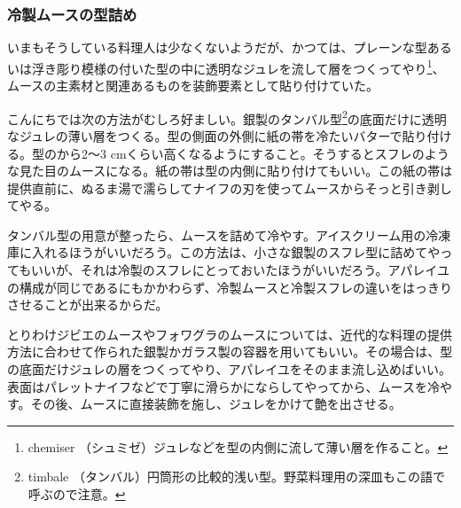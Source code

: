 \begin{recette}
\hypertarget{moulage-des-mousses-froides}{%
\subsubsection{冷製ムースの型詰め}\label{moulage-des-mousses-froides}}



いまもそうしている料理人は少なくないようだが、かつては、プレーンな型あるいは浮き彫り模様の付いた型の中に透明なジュレを流して層をつくってやり\footnote{chemiser
  （シュミゼ）ジュレなどを型の内側に流して薄い層を作ること。}、ムースの主素材と関連あるものを装飾要素として貼り付けていた。

こんにちでは次の方法がむしろ好ましい。銀製のタンバル型\footnote{timbale
  （タンバル）円筒形の比較的浅い型。野菜料理用の深皿もこの語で呼ぶので注意。}の底面だけに透明なジュレの薄い層をつくる。型の側面の外側に紙の帯を冷たいバターで貼り付ける。型のから2〜3
cmくらい高くなるようにすること。そうするとスフレのような見た目のムースになる。紙の帯は型の内側に貼り付けてもいい。この紙の帯は提供直前に、ぬるま湯で濡らしてナイフの刃を使ってムースからそっと引き剥してやる。

タンバル型の用意が整ったら、ムースを詰めて冷やす。アイスクリーム用の冷凍庫に入れるほうがいいだろう。この方法は、小さな銀製のスフレ型に詰めてやってもいいが、それは冷製のスフレにとっておいたほうがいいだろう。アパレイユの構成が同じであるにもかかわらず、冷製ムースと冷製スフレの違いをはっきりさせることが出来るからだ。

とりわけジビエのムースやフォワグラのムースについては、近代的な料理の提供方法に合わせて作られた銀製かガラス製の容器を用いてもいい。その場合は、型の底面だけジュレの層をつくってやり、アパレイユをそのまま流し込めばいい。表面はパレットナイフなどで丁寧に滑らかにならしてやってから、ムースを冷やす。その後、ムースに直接装飾を施し、ジュレをかけて艶を出させる。


\end{recette}
